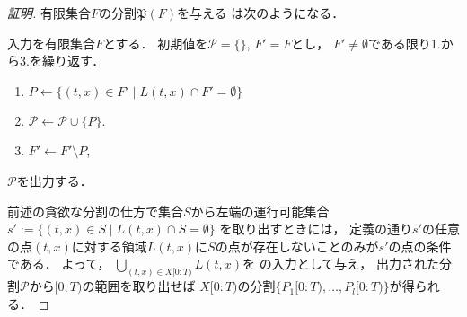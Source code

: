 \begin{proof}[証明]
有限集合$F$の分割$\mathfrak{P}(F)$を与える
{\setPartitionAlgorithm}は次のようになる．

\begin{setPartitionAlgorithmForTimeSpecifiedProblemOnLine}
入力を有限集合$F$とする．
初期値を$\mathcal{P} = \{\}$, $F' = F$とし，
$F' \neq \emptyset$である限り1.から3.を繰り返す．
\begin{enumerate}
\item $P \gets \{ (t, x) \in F' \mid L(t, x) \cap F' = \emptyset \}$
\item $\mathcal{P} \gets \mathcal{P} \cup \{ P \}$.
\item $F' \gets F' \setminus P$, 
\end{enumerate}
$\mathcal{P}$を出力する．
\end{setPartitionAlgorithmForTimeSpecifiedProblemOnLine}

前述の貪欲な分割の仕方で集合$S$から左端の運行可能集合
$s' := \{ (t, x) \in S \mid L(t, x) \cap S = \emptyset \}$
を取り出すときには，
定義の通り$s'$の任意の点$(t, x)$に対する領域$L(t, x)$に$S$の点が存在しないことのみが$s'$の点の条件である．
よって，
$\bigcup_{(t, x) \in X[0:T)} L(t, x)$を
{\setPartitionAlgorithm}の入力として与え，
出力された分割$\mathcal{P}$から$[0, T)$の範囲を取り出せば
$X[0:T)$の分割$\{ P_1[0:T), \ldots, P_l[0:T) \}$が得られる．
\end{proof}
